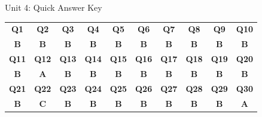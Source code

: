 \begin{answerkeytable}{Unit 4: Quick Answer Key}
\begin{tabular}{c c c c c c c c c c}
\toprule
\textbf{Q1} & \textbf{Q2} & \textbf{Q3} & \textbf{Q4} & \textbf{Q5} & \textbf{Q6} & \textbf{Q7} & \textbf{Q8} & \textbf{Q9} & \textbf{Q10} \\
\textbf{B} & \textbf{B} & \textbf{B} & \textbf{B} & \textbf{B} & \textbf{B} & \textbf{B} & \textbf{B} & \textbf{B} & \textbf{B} \\
\midrule
\textbf{Q11} & \textbf{Q12} & \textbf{Q13} & \textbf{Q14} & \textbf{Q15} & \textbf{Q16} & \textbf{Q17} & \textbf{Q18} & \textbf{Q19} & \textbf{Q20} \\
\textbf{B} & \textbf{A} & \textbf{B} & \textbf{B} & \textbf{B} & \textbf{B} & \textbf{B} & \textbf{B} & \textbf{B} & \textbf{B} \\
\midrule
\textbf{Q21} & \textbf{Q22} & \textbf{Q23} & \textbf{Q24} & \textbf{Q25} & \textbf{Q26} & \textbf{Q27} & \textbf{Q28} & \textbf{Q29} & \textbf{Q30} \\
\textbf{B} & \textbf{C} & \textbf{B} & \textbf{B} & \textbf{B} & \textbf{B} & \textbf{B} & \textbf{B} & \textbf{B} & \textbf{A} \\
\bottomrule
\end{tabular}
\end{answerkeytable}

